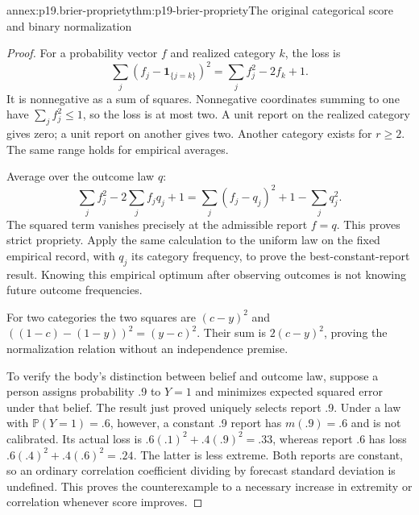 \begin{annexitem}{annex:p19.brier-propriety}{thm:p19-brier-propriety}{The original categorical score and binary normalization}
\begin{proof}
For a probability vector \(f\) and realized category \(k\), the loss is
\[
 \sum_j(f_j-\mathbf1_{\{j=k\}})^2=\sum_jf_j^2-2f_k+1.
\]
It is nonnegative as a sum of squares. Nonnegative coordinates summing to
one have \(\sum_jf_j^2\leq1\), so the loss is at most two. A unit
report on the realized category gives zero; a unit report on another gives
two. Another category exists for \(r\geq2\). The same range holds
for empirical averages.

Average over the outcome law \(q\):
\[
 \sum_jf_j^2-2\sum_jf_jq_j+1
 =\sum_j(f_j-q_j)^2+1-\sum_jq_j^2.
\]
The squared term vanishes precisely at the admissible report \(f=q\).
This proves strict propriety. Apply the same calculation to the uniform
law on the fixed empirical record, with \(q_j\) its category frequency,
to prove the best-constant-report result. Knowing this empirical optimum
after observing outcomes is not knowing future outcome frequencies.

For two categories the two squares are \((c-y)^2\) and
\(((1-c)-(1-y))^2=(y-c)^2\). Their sum is \(2(c-y)^2\), proving
the normalization relation without an independence premise.

To verify the body's distinction between belief and outcome law, suppose
a person assigns probability .9 to \(Y=1\) and minimizes expected
squared error under that belief. The result just proved uniquely selects
report .9. Under a law with \(\mathbb P(Y=1)=.6\), however, a constant
.9 report has \(m(.9)=.6\) and is not calibrated. Its actual loss is
\(.6(.1)^2+.4(.9)^2=.33\), whereas report .6 has loss
\(.6(.4)^2+.4(.6)^2=.24\). The latter is less extreme. Both reports
are constant, so an ordinary correlation coefficient dividing by forecast
standard deviation is undefined. This proves the counterexample to a
necessary increase in extremity or correlation whenever score improves.
\end{proof}
\end{annexitem}

